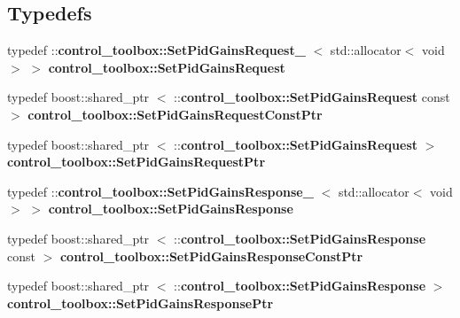 \subsection*{\-Typedefs}
\begin{DoxyCompactItemize}
\item 
typedef \*
\-::{\bf control\-\_\-toolbox\-::\-Set\-Pid\-Gains\-Request\-\_\-}\*
$<$ std\-::allocator$<$ void $>$ $>$ {\bf control\-\_\-toolbox\-::\-Set\-Pid\-Gains\-Request}
\item 
typedef boost\-::shared\-\_\-ptr\*
$<$ \-::{\bf control\-\_\-toolbox\-::\-Set\-Pid\-Gains\-Request} \*
const  $>$ {\bf control\-\_\-toolbox\-::\-Set\-Pid\-Gains\-Request\-Const\-Ptr}
\item 
typedef boost\-::shared\-\_\-ptr\*
$<$ \-::{\bf control\-\_\-toolbox\-::\-Set\-Pid\-Gains\-Request} $>$ {\bf control\-\_\-toolbox\-::\-Set\-Pid\-Gains\-Request\-Ptr}
\item 
typedef \*
\-::{\bf control\-\_\-toolbox\-::\-Set\-Pid\-Gains\-Response\-\_\-}\*
$<$ std\-::allocator$<$ void $>$ $>$ {\bf control\-\_\-toolbox\-::\-Set\-Pid\-Gains\-Response}
\item 
typedef boost\-::shared\-\_\-ptr\*
$<$ \-::{\bf control\-\_\-toolbox\-::\-Set\-Pid\-Gains\-Response} \*
const  $>$ {\bf control\-\_\-toolbox\-::\-Set\-Pid\-Gains\-Response\-Const\-Ptr}
\item 
typedef boost\-::shared\-\_\-ptr\*
$<$ \-::{\bf control\-\_\-toolbox\-::\-Set\-Pid\-Gains\-Response} $>$ {\bf control\-\_\-toolbox\-::\-Set\-Pid\-Gains\-Response\-Ptr}
\end{DoxyCompactItemize}
